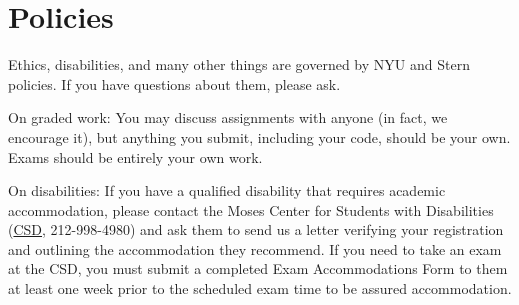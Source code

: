 \documentclass[11pt]{article}
\begin{document}
\section*{Policies}

Ethics, disabilities, and many other things are governed by NYU
and Stern policies.
If you have questions about them, please ask.

On graded work:
You may discuss assignments with anyone (in fact, we encourage it),
but anything you submit, including your code, should be your own.
Exams should be entirely your own work.

On disabilities:
If you have a qualified disability that requires academic accommodation,
please contact the Moses Center for Students with Disabilities
(\href{http://www.nyu.edu/life/safety-health-wellness/students-with-disabilities.html}{CSD},
212-998-4980) and ask them to
send us a letter verifying your registration and outlining the accommodation they recommend.
If you need to take an exam at the CSD,
you must submit a completed Exam Accommodations Form to them
at least one week prior to the scheduled exam time to be assured accommodation.



\end{document}
